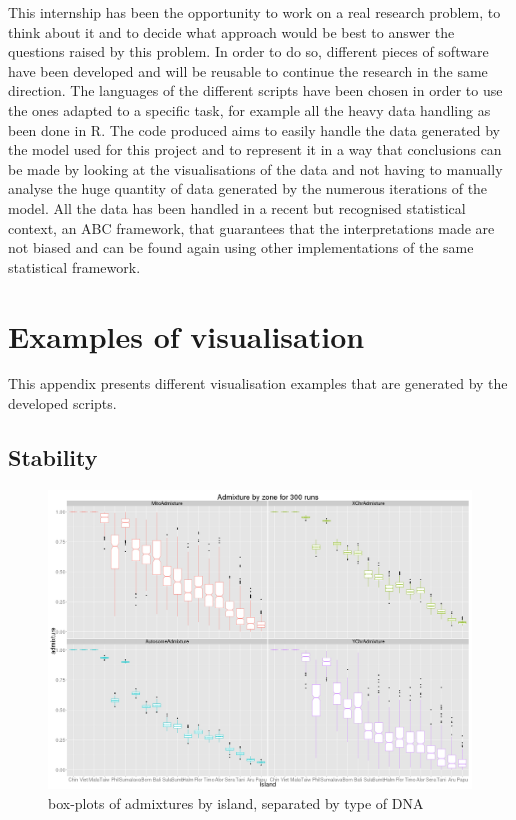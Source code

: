 \documentclass[a4paper,12pt]{report}
\begin{document}
This internship has been the opportunity to work on a real research problem, to think about it and to decide what approach would be best to answer the questions raised by this problem. In order to do so, different pieces of software have been developed and will be reusable to continue the research in the same direction. The languages of the different scripts have been chosen in order to use the ones adapted to a specific task, for example all the heavy data handling as been done in R. The code produced aims to easily handle the data generated by the model used for this project and to represent it in a way that conclusions can be made by looking at the visualisations of the data and not having to manually analyse the huge quantity of data generated by the numerous iterations of the model. All the data has been handled in a recent but recognised statistical context, an ABC framework, that guarantees that the interpretations made are not biased and can be found again using other implementations of the same statistical framework.




\appendix
\renewcommand{\thesection}{\Roman{section}}
\chapter{Examples of visualisation}
\label{app:ex-visu}

This appendix presents different visualisation examples that are generated by the developed scripts.

\section{Stability}
\begin{figure}[!htbp]
	\centering
	\includegraphics[scale=0.22]{../data/stability.png}
	\caption{box-plots of admixtures by island, separated by type of DNA}
	\label{app:stability}
\end{figure}
\end{document}

